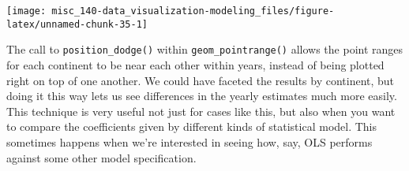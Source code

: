 \documentclass[]{book}
\newenvironment{Shaded}{\begin{snugshade}}{\end{snugshade}}
\newcommand{\CommentTok}[1]{\textcolor[rgb]{0.56,0.35,0.01}{\textit{#1}}}
\newcommand{\DataTypeTok}[1]{\textcolor[rgb]{0.13,0.29,0.53}{#1}}
\newcommand{\DecValTok}[1]{\textcolor[rgb]{0.00,0.00,0.81}{#1}}
\newcommand{\KeywordTok}[1]{\textcolor[rgb]{0.13,0.29,0.53}{\textbf{#1}}}
\newcommand{\NormalTok}[1]{#1}
\newcommand{\OperatorTok}[1]{\textcolor[rgb]{0.81,0.36,0.00}{\textbf{#1}}}
\newcommand{\StringTok}[1]{\textcolor[rgb]{0.31,0.60,0.02}{#1}}
\begin{document}
\begin{Shaded}
\end{Shaded}

\begin{center}\texttt{[image: misc\_140-data\_visualization-modeling\_files/figure-latex/unnamed-chunk-35-1]} \end{center}

The call to \texttt{position\_dodge()} within \texttt{geom\_pointrange()} allows the point ranges for each continent to be near each other within years, instead of being plotted right on top of one another. We could have faceted the results by continent, but doing it this way lets us see differences in the yearly estimates much more easily. This technique is very useful not just for cases like this, but also when you want to compare the coefficients given by different kinds of statistical model. This sometimes happens when we're interested in seeing how, say, OLS performs against some other model specification.
\end{document}
